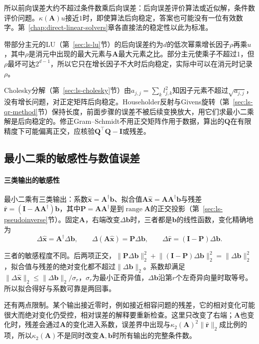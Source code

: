 所以前向误差大约不超过条件数乘后向误差：后向误差评价算法或近似解，条件数评价问题。$\kappa(\bm A)u$接近$1$时，即使算法后向稳定，答案也可能没有一位有效数字。第~\ref{chap:direct-linear-solvers}章各直接法的稳定性以此为标准。

带部分主元的LU（第~\ref{sec:ls-lu}节）的后向误差约为$d$的低次幂乘增长因子$\rho$再乘$u$，其中$\rho$是消元中出现的最大元素与$\bm A$最大元素之比。部分主元使乘子不超过$1$，但$\rho$最坏可达$2^{d-1}$，所以它只在增长因子不大时后向稳定，实际中可以在消元时记录$\rho$。

Cholesky分解（第~\ref{sec:ls-cholesky}节）由$a_{j,j}=\sum_kl_{j,k}^2$知因子元素不超过$\sqrt{a_{j,j}}$，没有增长问题，对正定矩阵后向稳定。Householder反射与Givens旋转（第~\ref{sec:ls-qr-method}节）保持长度，前面步骤的误差不被后续变换放大，用它们求最小二乘解是后向稳定的。修正Gram--Schmidt不用正交矩阵作用于数据，算出的$\bm Q$在有限精度下可能偏离正交，应核验$\bm Q^\top\bm Q-\bm I$或残差。

\subsection{最小二乘的敏感性与数值误差}
\label{sec:ls-ls-regularization-sensitivity}

\paragraph{三类输出的敏感性}
最小二乘有三类输出：系数$\hat{\bm x}=\bm A^\dagger\bm b$、拟合值$\bm A\hat{\bm x}=\bm A\bm A^\dagger\bm b$与残差$\hat{\bm r}=(\bm I-\bm A\bm A^\dagger)\bm b$，其中$\bm P=\bm A\bm A^\dagger$是到$\operatorname{range}\bm A$的正交投影（第~\ref{sec:ls-pseudoinverse}节）。固定$\bm A$，右端改变$\Delta\bm b$时，三者都是$\bm b$的线性函数，变化精确地为
\[
 \Delta\hat{\bm x}=\bm A^\dagger\Delta\bm b,\qquad
 \Delta(\bm A\hat{\bm x})=\bm P\Delta\bm b,\qquad
 \Delta\hat{\bm r}=(\bm I-\bm P)\Delta\bm b .
\]

三者的敏感程度不同。后两项正交，$\lVert\bm P\Delta\bm b\rVert_2^2+\lVert(\bm I-\bm P)\Delta\bm b\rVert_2^2=\lVert\Delta\bm b\rVert_2^2$，拟合值与残差的绝对变化都不超过$\lVert\Delta\bm b\rVert_2$。系数却满足$\lVert\Delta\hat{\bm x}\rVert_2\leq\lVert\Delta\bm b\rVert_2/\sigma_r$，$\sigma_r$为最小正奇异值，$\Delta\bm b$沿第$r$个左奇异向量时取等号。所以拟合得好与系数可靠是两回事。

还有两点限制。某个输出接近零时，例如接近相容问题的残差，它的相对变化可能很大而绝对变化仍受控，相对误差的解释要重新检查。这里只改变了右端；$\bm A$也变化时，残差会通过$\bm A$的变化进入系数，误差界中出现与$\kappa_2(\bm A)^2\lVert\hat{\bm r}\rVert_2$成比例的项，所以$\kappa_2(\bm A)$不是同时改变$\bm A,\bm b$时所有输出的完整条件数。

